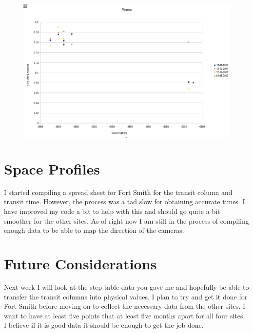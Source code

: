 \documentclass[11pt]{article}
\begin{document}
\begin{figure}
\includegraphics[scale=0.6]{norm_pinawa_december.jpg}
\end{figure}

\vspace{10mm}

\section{Space Profiles}
\hspace{0.5cm}

I started compiling a spread sheet for Fort Smith for the transit column and transit time. However, the process was a tad slow for obtaining accurate times. I have improved my code a bit to help with this and should go quite a bit smoother for the other sites. As of right now I am still in the process of compiling enough data to be able to map the direction of the cameras. 



\section{Future Considerations}
\hspace{0.5cm}

Next week I will look at the step table data you gave me and hopefully be able to transfer the transit columns into physical values. I plan to try and get it done for Fort Smith before moving on to collect the necessary data from the other sites. I want to have at least five points that at least five months apart for all four sites. I believe if it is good data it should be enough to get the job done.
\end{document}
